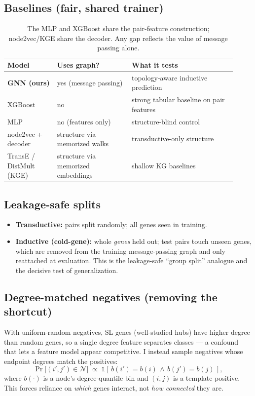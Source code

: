 \documentclass[11pt]{article}
\begin{document}
\subsection{Baselines (fair, shared trainer)}
\begin{table}[h]
\centering
\small
\begin{tabular}{>{\raggedright\arraybackslash}p{0.20\linewidth} >{\raggedright\arraybackslash}p{0.30\linewidth} >{\raggedright\arraybackslash}p{0.42\linewidth}}
\toprule
\rowcolor{sriblue}\color{white}\textbf{Model} & \color{white}\textbf{Uses graph?} & \color{white}\textbf{What it tests}\\
\midrule
\rowcolor{srirow} \textbf{GNN (ours)} & yes (message passing) & topology-aware inductive prediction\\
XGBoost & no & strong tabular baseline on pair features\\
\rowcolor{srirow} MLP & no (features only) & structure-blind control\\
node2vec + decoder & structure via memorized walks & transductive-only structure\\
\rowcolor{srirow} TransE / DistMult (KGE) & structure via memorized embeddings & shallow KG baselines\\
\bottomrule
\end{tabular}
\caption{The MLP and XGBoost share the pair-feature construction; node2vec/KGE
share the decoder. Any gap reflects the value of message passing alone.}
\label{tab:models}
\end{table}

\subsection{Leakage-safe splits}
\begin{itemize}[leftmargin=1.4em,itemsep=1pt]
\item \textbf{Transductive:} pairs split randomly; all genes seen in training.
\item \textbf{Inductive (cold-gene):} whole \emph{genes} held out; test pairs
touch unseen genes, which are removed from the training message-passing graph
and only reattached at evaluation. This is the leakage-safe ``group split''
analogue and the decisive test of generalization.
\end{itemize}

\subsection{Degree-matched negatives (removing the shortcut)}
With uniform-random negatives, SL genes (well-studied hubs) have higher degree
than random genes, so a single degree feature separates classes --- a confound
that lets a feature model appear competitive. I instead sample negatives whose
endpoint degrees match the positives:
\[
\Pr\big[(i',j')\in\mathcal{N}\big] \;\propto\;
\mathbb{1}\!\left[\,b(i')=b(i)\,\wedge\,b(j')=b(j)\,\right],
\]
where $b(\cdot)$ is a node's degree-quantile bin and $(i,j)$ is a template
positive. This forces reliance on \emph{which} genes interact, not \emph{how
connected} they are.
\end{document}

